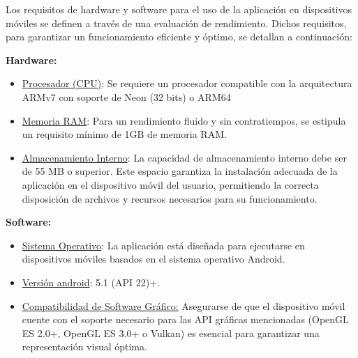 Los requisitos de hardware y software para el uso de la aplicación en dispositivos móviles se definen a través de una evaluación de rendimiento. Dichos requisitos, para garantizar un funcionamiento eficiente y óptimo, se detallan a continuación:

\textbf{Hardware:}
\begin{itemize}
    \item \underline{Procesador (CPU)}: Se requiere un procesador compatible con la arquitectura ARMv7 con soporte de Neon (32 bits) o ARM64
    \item  \underline{Memoria RAM}: Para un rendimiento fluido y sin contratiempos, se estipula un requisito mínimo de 1GB de memoria RAM.  
    \item \underline{Almacenamiento Interno}: La capacidad de almacenamiento interno debe ser de 55 MB o superior. Este espacio garantiza la instalación adecuada de la aplicación en el dispositivo móvil del usuario, permitiendo la correcta disposición de archivos y recursos necesarios para su funcionamiento.   
\end{itemize}

\textbf{Software:}
\begin{itemize}
    \item \underline{Sistema Operativo}: La aplicación está diseñada para ejecutarse en dispositivos móviles basados en el sistema operativo Android.
    \item \underline{Versión android}: 5.1 (API 22)+.
    \item \underline{Compatibilidad de Software Gráfico:} Asegurarse de que el dispositivo móvil cuente con el soporte necesario para las API gráficas mencionadas (OpenGL ES 2.0+, OpenGL ES 3.0+ o Vulkan) es esencial para garantizar una representación visual óptima. 
\end{itemize} 